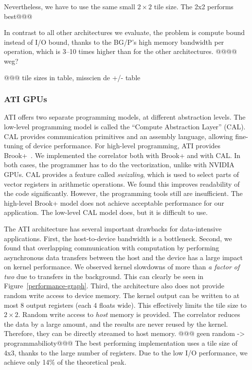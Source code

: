 \documentclass{article}
\begin{document}
Nevertheless, we have to use the same small $2 \times 2$ tile size.
The 2x2 performs best@@@

In contrast to all other architectures we evaluate, the problem is compute
bound instead of I/O bound, thanks to the BG/P's high memory bandwidth per
operation, which is 3--10 times higher than for the other architectures.
@@@@ weg?

@@@ tile sizes in table, misscien de +/- table

\subsubsection{ATI GPUs}

ATI offers two separate programming models, at different abstraction
levels.  The low-level programming model is called the ``Compute
Abstraction Layer'' (CAL).  CAL provides communication primitives and
an assembly language, allowing fine-tuning of device
performance. For high-level programming, ATI provides Brook+~\cite{amd-manual}.  We
implemented the correlator both with Brook+ and with CAL.
In both cases, the programmer has to do the vectorization,
unlike with NVIDIA GPUs.  CAL provides a feature called
\emph{swizzling}, which is used to select parts of vector registers in
arithmetic operations.  We found this improves readability of the code
significantly. However, the
programming tools still are insufficient. The high-level Brook+ model does
not achieve acceptable performance for our application. The low-level
CAL model does, but it is difficult to use.

The ATI architecture has several important
drawbacks for data-intensive applications.  First, the
host-to-device bandwidth is a bottleneck.  Second, we found that
overlapping communication with computation by performing asynchronous
data transfers between the host and the device has a large impact on
kernel performance. We observed kernel slowdowns of more than \emph{a factor of
two} due to transfers in the background. This can clearly be seen in Figure~\ref{performance-graph}.
Third, the architecture also does not provide random write access to device
memory. The kernel output can be written to at most 8 output registers
(each 4 floats wide).  This effectively limits the
tile size to $2\times2$.  Random write access to \emph{host} memory is
provided.  The correlator reduces the data by a large amount, and the
results are never reused by the kernel. Therefore, they can be
directly streamed to host memory.
@@@ geen random -> programmabilioty@@@
The best performing implementation uses a tile size of 4x3, thanks to
the large number of registers.  
Due to the low I/O performance, we achieve only 14\% of the theoretical peak.
\end{document}
